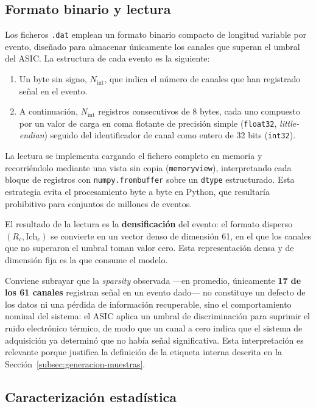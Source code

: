 \subsection{Formato binario y lectura}
\label{subsec:formato-binario}

Los ficheros \texttt{.dat} emplean un formato binario compacto de longitud variable por evento,
diseñado para almacenar únicamente los canales que superan el umbral del ASIC. La estructura de
cada evento es la siguiente:

\begin{enumerate}
    \item Un byte sin signo, $N_{\text{int}}$, que indica el número de canales que han registrado
    señal en el evento.
    \item A continuación, $N_{\text{int}}$ registros consecutivos de 8 bytes, cada uno compuesto por
    un valor de carga en coma flotante de precisión simple (\texttt{float32}, \emph{little-endian})
    seguido del identificador de canal como entero de 32 bits (\texttt{int32}).
\end{enumerate}

La lectura se implementa cargando el fichero completo en memoria y recorriéndolo mediante una vista
sin copia (\texttt{memoryview}), interpretando cada bloque de registros con
\texttt{numpy.frombuffer} sobre un \texttt{dtype} estructurado. Esta estrategia evita el
procesamiento byte a byte en Python, que resultaría prohibitivo para conjuntos de millones de
eventos.

El resultado de la lectura es la \textbf{densificación} del evento: el formato disperso
$(R_c, \mathrm{Ich}_c)$ se convierte en un vector denso de dimensión 61, en el que los canales que no
superaron el umbral toman valor cero. Esta representación densa y de dimensión fija es la que
consume el modelo.

Conviene subrayar que la \emph{sparsity} observada ---en promedio, únicamente \textbf{17 de los 61
canales} registran señal en un evento dado--- no constituye un defecto de los datos ni una pérdida
de información recuperable, sino el comportamiento nominal del sistema: el ASIC aplica un umbral de
discriminación para suprimir el ruido electrónico térmico, de modo que un canal a cero indica que el
sistema de adquisición ya determinó que no había señal significativa. Esta interpretación es
relevante porque justifica la definición de la etiqueta interna descrita en la
Sección~\ref{subsec:generacion-muestras}.

\subsection{Caracterización estadística}
\label{subsec:caracterizacion-datos}

